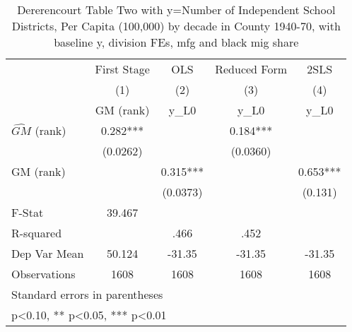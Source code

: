 \begin{table}[htbp]\centering
\def\sym#1{\ifmmode^{#1}\else\(^{#1}\)\fi}
\caption{Dererencourt Table Two with y=Number of Independent School Districts, Per Capita (100,000) by decade in County 1940-70, with baseline y, division FEs, mfg and black mig share}
\begin{tabular}{l*{4}{c}}
\toprule
                    & First Stage   &         OLS   &Reduced Form   &        2SLS   \\
                    &\multicolumn{1}{c}{(1)}&\multicolumn{1}{c}{(2)}&\multicolumn{1}{c}{(3)}&\multicolumn{1}{c}{(4)}\\
                    &\multicolumn{1}{c}{GM  (rank)}&\multicolumn{1}{c}{y\_L0}&\multicolumn{1}{c}{y\_L0}&\multicolumn{1}{c}{y\_L0}\\
\midrule
$\hat{GM}$ (rank)   &       0.282***&               &       0.184***&               \\
                    &    (0.0262)   &               &    (0.0360)   &               \\
\addlinespace
GM  (rank)          &               &       0.315***&               &       0.653***\\
                    &               &    (0.0373)   &               &     (0.131)   \\
\midrule
F-Stat              &      39.467   &               &               &               \\
R-squared           &               &        .466   &        .452   &               \\
Dep Var Mean        &      50.124   &      -31.35   &      -31.35   &      -31.35   \\
Observations        &        1608   &        1608   &        1608   &        1608   \\
\bottomrule
\multicolumn{5}{l}{\footnotesize Standard errors in parentheses}\\
\multicolumn{5}{l}{\footnotesize * p<0.10, ** p<0.05, *** p<0.01}\\
\end{tabular}
\end{table}
